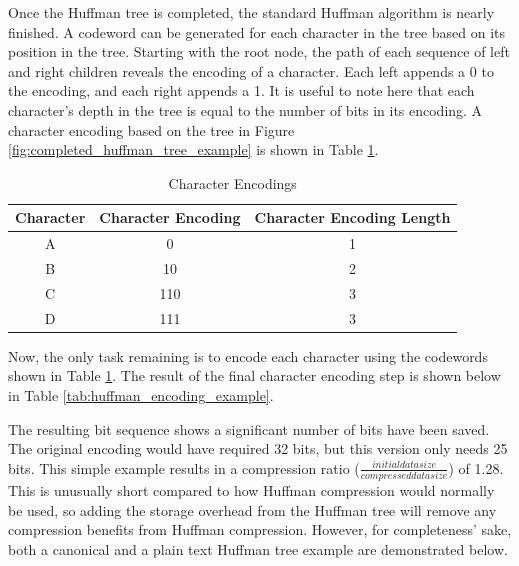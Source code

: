 \documentclass[doublespace,nopageskip]{VTthesis}
\begin{document}
Once the Huffman tree is completed, the standard Huffman algorithm is nearly finished. A codeword can be generated for each character in the tree based on its position in the tree. Starting with the root node, the path of each sequence of left and right children reveals the encoding of a character. Each left appends a 0 to the encoding, and each right appends a 1. It is useful to note here that each character's depth in the tree is equal to the number of bits in its encoding. A character encoding based on the tree in Figure \ref{fig:completed_huffman_tree_example} is shown in Table \ref{tab:huffman_encodings}.

\begin{table}[htb]
	\centering
	\caption{Character Encodings}
	\begin{tabular}{ccc}
	    \toprule
	    Character & Character Encoding & Character Encoding Length\\
	    \midrule
	    A & 0 & 1\\
	    \midrule
	    B & 10 & 2\\
	    \midrule
	    C & 110 & 3\\
	    \midrule
	    D & 111 & 3\\
	    \bottomrule
	\end{tabular}
	\label{tab:huffman_encodings}
\end{table}

Now, the only task remaining is to encode each character using the codewords shown in Table \ref{tab:huffman_encodings}. The result of the final character encoding step is shown below in Table \ref{tab:huffman_encoding_example}.

The resulting bit sequence shows a significant number of bits have been saved. The original encoding would have required 32 bits, but this version only needs 25 bits. This simple example results in a compression ratio ($\frac{initial data size}{compressed data size}$) of 1.28. This is unusually short compared to how Huffman compression would normally be used, so adding the storage overhead from the Huffman tree will remove any compression benefits from Huffman compression. However, for completeness' sake, both a canonical and a plain text Huffman tree example are demonstrated below.
\end{document}
